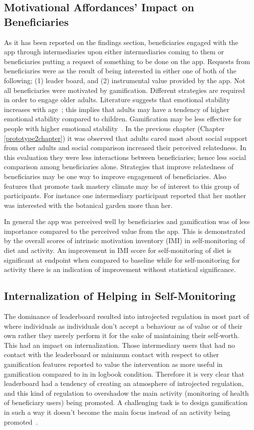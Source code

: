 \subsection{Motivational Affordances' Impact on Beneficiaries}
As it has been reported on the findings section, beneficiaries engaged with the app through intermediaries upon either intermediaries coming to them or beneficiaries putting a request of something to be done on the app. Requests from beneficiaries were as the result of being interested in either one of both of the following; (1) leader board, and (2) instrumental value provided by the app. Not all beneficiaries were motivated by gamification. Different strategies are required in order to engage older adults. Literature suggests that emotional stability increases with age~\citep{carstensen2011emotional}; this implies that adults may have a tendency of higher emotional stability compared to children. Gamification may be less effective for people with higher emotional stability~\citep{jia2016personality}. In the previous chapter (Chapter \ref{prototype2chapter}) it was observed that adults cared most about social support from other adults and social comparison increased their perceived relatedness. In this evaluation they were less interactions between beneficiaries; hence less social comparison among beneficiaries alone. Strategies that improve relatedness of beneficiaries may be one way to improve engagement of beneficiaries. Also features that promote task mastery climate may be of interest to this group of participants. For instance one intermediary participant reported that her mother was interested with the botanical garden more than her. 

In general the app was perceived well by beneficiaries and gamification was of less importance compared to the perceived value from the app. This is demonstrated by the overall scores of intrinsic motivation inventory (IMI) in self-monitoring of diet and activity. An improvement in IMI score for self-monitoring of diet is significant at endpoint when compared to baseline while for self-monitoring for activity there is an indication of improvement without statistical significance.      
\subsection{Internalization of Helping in Self-Monitoring}
The dominance of leaderboard resulted into introjected regulation in most part of where individuals as individuals don't accept a behaviour as of value or of their own rather they merely perform it for the sake of maintaining their self-worth. This had an impact on internalization. Those intermediary users that had no contact with the leaderboard or minimum contact with respect to other gamification features reported to value the intervention as more useful in gamification compared to in in logbook condition. Therefore it is very clear that leaderboard had a tendency of creating an atmosphere of introjected regulation, and this kind of regulation  to overshadow the main activity (monitoring of health of beneficiary users) being promoted. A challenging task is to design gamification in such a way it doesn't become the main focus instead of an activity being promoted~\citep{knaving2013designing}.

